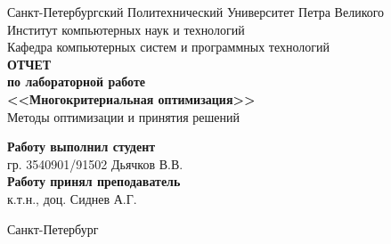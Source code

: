 \begin{titlepage}
\begin{center}
	Санкт-Петербургский Политехнический Университет Петра Великого\\[0.3cm]
	Институт компьютерных наук и технологий \\[0.3cm]
	Кафедра компьютерных систем и программных технологий\\[4cm]
	
	\textbf{ОТЧЕТ}\\ 
	\textbf{по лабораторной работе}\\[0.5cm]
	\textbf{<<Многокритериальная оптимизация>>}\\[0.1cm]
	Методы оптимизации и принятия решений\\[3.0cm]
\end{center}

\begin{flushright}
	\begin{minipage}{0.5\textwidth}
		\textbf{Работу выполнил студент}\\[3mm]
		гр. 3540901/91502 \hfill \sign[1.1cm] \hfill Дьячков В.В.\\[5mm]
		\textbf{Работу принял преподаватель}\\[5mm]
		\sign[3cm] \hfill к.т.н., доц. Сиднев А.Г. \\[5mm]
	\end{minipage}
\end{flushright}

\vfill

\begin{center}
	Санкт-Петербург\\[0.3cm]
	\the\year
\end{center}
\end{titlepage}

\addtocounter{page}{1}